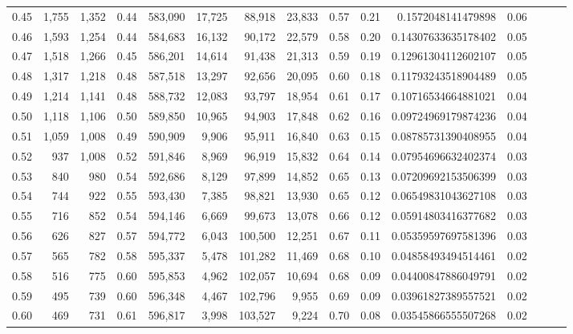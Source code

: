 \begin{tabular}{rrrrrrrrrrrrrrr}
0.45 &   1,755 &  1,352 &  0.44 &  583,090 &   17,725 &   88,918 &   23,833 &  0.57 &  0.21 &      0.1572048141479898 &      0.06 \\
0.46 &   1,593 &  1,254 &  0.44 &  584,683 &   16,132 &   90,172 &   22,579 &  0.58 &  0.20 &     0.14307633635178402 &      0.05 \\
0.47 &   1,518 &  1,266 &  0.45 &  586,201 &   14,614 &   91,438 &   21,313 &  0.59 &  0.19 &     0.12961304112602107 &      0.05 \\
0.48 &   1,317 &  1,218 &  0.48 &  587,518 &   13,297 &   92,656 &   20,095 &  0.60 &  0.18 &     0.11793243518904489 &      0.05 \\
0.49 &   1,214 &  1,141 &  0.48 &  588,732 &   12,083 &   93,797 &   18,954 &  0.61 &  0.17 &     0.10716534664881021 &      0.04 \\
0.50 &   1,118 &  1,106 &  0.50 &  589,850 &   10,965 &   94,903 &   17,848 &  0.62 &  0.16 &     0.09724969179874236 &      0.04 \\
0.51 &   1,059 &  1,008 &  0.49 &  590,909 &    9,906 &   95,911 &   16,840 &  0.63 &  0.15 &     0.08785731390408955 &      0.04 \\
0.52 &     937 &  1,008 &  0.52 &  591,846 &    8,969 &   96,919 &   15,832 &  0.64 &  0.14 &     0.07954696632402374 &      0.03 \\
0.53 &     840 &    980 &  0.54 &  592,686 &    8,129 &   97,899 &   14,852 &  0.65 &  0.13 &     0.07209692153506399 &      0.03 \\
0.54 &     744 &    922 &  0.55 &  593,430 &    7,385 &   98,821 &   13,930 &  0.65 &  0.12 &     0.06549831043627108 &      0.03 \\
0.55 &     716 &    852 &  0.54 &  594,146 &    6,669 &   99,673 &   13,078 &  0.66 &  0.12 &     0.05914803416377682 &      0.03 \\
0.56 &     626 &    827 &  0.57 &  594,772 &    6,043 &  100,500 &   12,251 &  0.67 &  0.11 &     0.05359597697581396 &      0.03 \\
0.57 &     565 &    782 &  0.58 &  595,337 &    5,478 &  101,282 &   11,469 &  0.68 &  0.10 &     0.04858493494514461 &      0.02 \\
0.58 &     516 &    775 &  0.60 &  595,853 &    4,962 &  102,057 &   10,694 &  0.68 &  0.09 &     0.04400847886049791 &      0.02 \\
0.59 &     495 &    739 &  0.60 &  596,348 &    4,467 &  102,796 &    9,955 &  0.69 &  0.09 &     0.03961827389557521 &      0.02 \\
0.60 &     469 &    731 &  0.61 &  596,817 &    3,998 &  103,527 &    9,224 &  0.70 &  0.08 &     0.03545866555507268 &      0.02 \\

\end{tabular}
